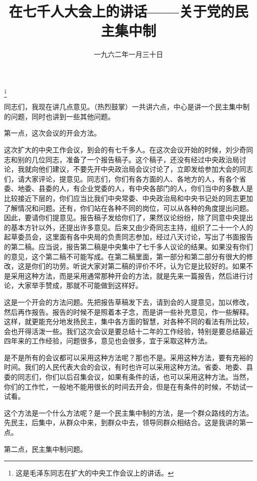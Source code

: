 
\title{在七千人大会上的讲话——关于党的民主集中制}
\date{一九六二年一月三十日}
\thanks{这是毛泽东同志在扩大的中央工作会议上的讲话。}
\maketitle


同志们，我现在讲几点意见。（热烈鼓掌）一共讲六点，中心是讲一个民主集中制的问题，同时也讲到一些其他问题。

第一点，这次会议的开会方法。

这次扩大的中央工作会议，到会的有七千多人。在这次会议开始的时候，刘少奇同志和别的几位同志，准备了一个报告稿子。这个稿子，还没有经过中央政治局讨论，我就向他们建议，不要先开中央政治局会议讨论了，立即发给参加大会的同志们，请大家评论，提意见。同志们，你们有各方面的人、各地方的人，有各个省委、地委、县委的人，有企业党委的人，有中央各部门的人，你们当中的多数人是比较接近下层的，你们应当比我们中央常委、中央政治局和中央书记处的同志更加了解情况和问题。还有，你们站在各种不同的岗位，可以从各种的角度提出问题。因此，要请你们提意见。报告稿子发给你们了，果然议论纷纷，除了同意中央提出的基本方针以外，还提出许多意见。后来又由少奇同志主持，组织了二十一个人的起草委员会，这里面有各中央局的负责同志参加，经过八天讨论，写出了书面报告的第二稿。应当说，报告第二稿是中央集中了七千多人议论的结果。如果没有你们的意见，这个第二稿不可能写成。在第二稿里面，第一部分和第二部分有很大的修改，这是你们的功劳。听说大家对第二稿的评价不坏，认为它是比较好的。如果不是采用这种方法，而是采用通常那种开会的方法，就是先来一篇报告，然后进行讨论，大家举手赞成，那就不可能做到这样好。

这是一个开会的方法问题。先把报告草稿发下去，请到会的人提意见，加以修改，然后再作报告。报告的时候不是照着本子念，而是讲一些补充意见，作一些解释。这样，就更能充分地发扬民主，集中各方面的智慧，对各种不同的看法有所比较，会也开得活泼一些。我们这次会议是要总结十二年的工作经验，特别是要总结最近四年来的工作经验，问题很多，意见也会很多，宜于采取这种方法。

是不是所有的会议都可以采用这种方法呢？那也不是。采用这种方法，要有充裕的时间。我们的人民代表大会的会议，有时也许可以采用这种方法。省委、地委、县委的同志们，你们以后召集会议，如果有条件的话，也可以采用这种方法。当然，你们的工作忙，一般地不能用很长的时间去开会，但是在有条件的时候，不妨试一试看。

这个方法是一个什么方法呢？是一个民主集中制的方法，是一个群众路线的方法。先民主，后集中，从群众中来，到群众中去，领导同群众相结合。这是我讲的第一点。

第二点，民主集中制问题。

